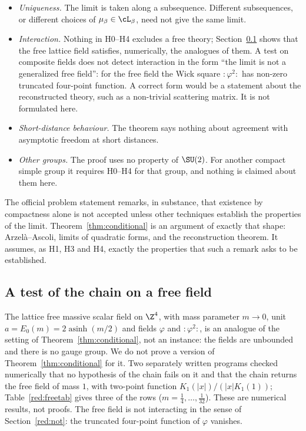 \begin{itemize}
\item \emph{Uniqueness.} The limit is taken along a subsequence. Different subsequences, or different choices of $\mu_\beta\in\cL_\beta$, need not give the same limit.
\item \emph{Interaction.} Nothing in H0--H4 excludes a free theory; Section~\ref{red:free} shows that the free lattice field satisfies, numerically, the analogues of them. A test on composite fields does not detect interaction in the form ``the limit is not a generalized free field'': for the free field the Wick square $:\!\varphi^2\!:$ has non-zero truncated four-point function. A correct form would be a statement about the reconstructed theory, such as a non-trivial scattering matrix. It is not formulated here.
\item \emph{Short-distance behaviour.} The theorem says nothing about agreement with asymptotic freedom at short distances.
\item \emph{Other groups.} The proof uses no property of $\SU(2)$. For another compact simple group it requires H0--H4 for that group, and nothing is claimed about them here.
\end{itemize}
The official problem statement \cite{JW} remarks, in substance, that existence by compactness alone is not accepted unless other techniques establish the properties of the limit. Theorem~\ref{thm:conditional} is an argument of exactly that shape: Arzel\`a--Ascoli, limits of quadratic forms, and the reconstruction theorem. It assumes, as H1, H3 and H4, exactly the properties that such a remark asks to be established.

\subsection{A test of the chain on a free field}\label{red:free}

The lattice free massive scalar field on $\Z^4$, with mass parameter $m\to0$, unit $a=E_0(m)=2\operatorname{asinh}(m/2)$ and fields $\varphi$ and $:\!\varphi^2\!:$, is an analogue of the setting of Theorem~\ref{thm:conditional}, not an instance: the fields are unbounded and there is no gauge group. We do not prove a version of Theorem~\ref{thm:conditional} for it. Two separately written programs checked numerically that no hypothesis of the chain fails on it and that the chain returns the free field of mass $1$, with two-point function $K_1(|x|)/(|x|K_1(1))$; Table~\ref{red:freetab} gives three of the rows ($m=\tfrac14,\dots,\tfrac1{32}$). These are numerical results, not proofs. The free field is not interacting in the sense of Section~\ref{red:not}: the truncated four-point function of $\varphi$ vanishes.

